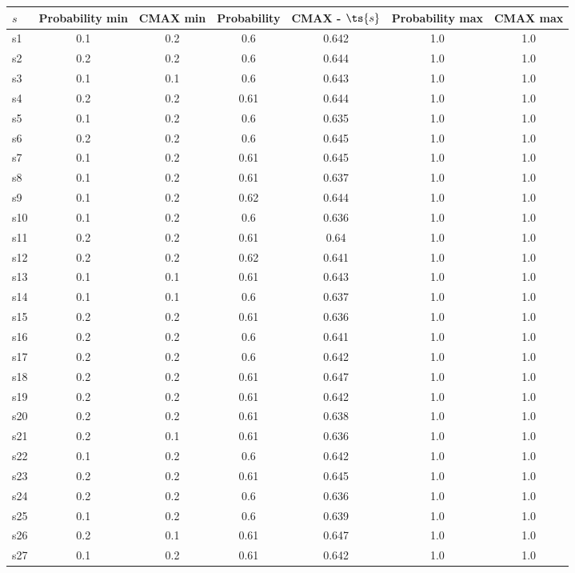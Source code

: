\documentclass{article}
\begin{document}
\noindent\begin{tabular}{|l|c|c|c|c|c|c|}
\hline
$s$& Probability min & CMAX min & Probability & CMAX - $\ts{s}$ & Probability max & CMAX max\\
\hline
s1 &0.1 & 0.2 & 0.6 & 0.642 & 1.0 & 1.0\\
\hline
s2 &0.2 & 0.2 & 0.6 & 0.644 & 1.0 & 1.0\\
\hline
s3 &0.1 & 0.1 & 0.6 & 0.643 & 1.0 & 1.0\\
\hline
s4 &0.2 & 0.2 & 0.61 & 0.644 & 1.0 & 1.0\\
\hline
s5 &0.1 & 0.2 & 0.6 & 0.635 & 1.0 & 1.0\\
\hline
s6 &0.2 & 0.2 & 0.6 & 0.645 & 1.0 & 1.0\\
\hline
s7 &0.1 & 0.2 & 0.61 & 0.645 & 1.0 & 1.0\\
\hline
s8 &0.1 & 0.2 & 0.61 & 0.637 & 1.0 & 1.0\\
\hline
s9 &0.1 & 0.2 & 0.62 & 0.644 & 1.0 & 1.0\\
\hline
s10 &0.1 & 0.2 & 0.6 & 0.636 & 1.0 & 1.0\\
\hline
s11 &0.2 & 0.2 & 0.61 & 0.64 & 1.0 & 1.0\\
\hline
s12 &0.2 & 0.2 & 0.62 & 0.641 & 1.0 & 1.0\\
\hline
s13 &0.1 & 0.1 & 0.61 & 0.643 & 1.0 & 1.0\\
\hline
s14 &0.1 & 0.1 & 0.6 & 0.637 & 1.0 & 1.0\\
\hline
s15 &0.2 & 0.2 & 0.61 & 0.636 & 1.0 & 1.0\\
\hline
s16 &0.2 & 0.2 & 0.6 & 0.641 & 1.0 & 1.0\\
\hline
s17 &0.2 & 0.2 & 0.6 & 0.642 & 1.0 & 1.0\\
\hline
s18 &0.2 & 0.2 & 0.61 & 0.647 & 1.0 & 1.0\\
\hline
s19 &0.2 & 0.2 & 0.61 & 0.642 & 1.0 & 1.0\\
\hline
s20 &0.2 & 0.2 & 0.61 & 0.638 & 1.0 & 1.0\\
\hline
s21 &0.2 & 0.1 & 0.61 & 0.636 & 1.0 & 1.0\\
\hline
s22 &0.1 & 0.2 & 0.6 & 0.642 & 1.0 & 1.0\\
\hline
s23 &0.2 & 0.2 & 0.61 & 0.645 & 1.0 & 1.0\\
\hline
s24 &0.2 & 0.2 & 0.6 & 0.636 & 1.0 & 1.0\\
\hline
s25 &0.1 & 0.2 & 0.6 & 0.639 & 1.0 & 1.0\\
\hline
s26 &0.2 & 0.1 & 0.61 & 0.647 & 1.0 & 1.0\\
\hline
s27 &0.1 & 0.2 & 0.61 & 0.642 & 1.0 & 1.0\\

\end{tabular}
\end{document}
